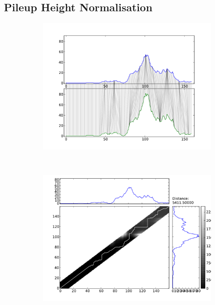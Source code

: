 \documentclass[parskip]{cs4rep}
\begin{document}
\subsection{Pileup Height Normalisation}
\begin{figure}
   \centering
   \begin{subfigure}[b]{0.3\textwidth}
       \includegraphics[width=\textwidth]{figures/methods/pileup_normalisation/mappings_x_1_5_x.pdf}
       \caption{}
       \label{fig:pileup_normalisation:mappings_unnormalised}
   \end{subfigure}
   ~
   \begin{subfigure}[b]{0.3\textwidth}
       \includegraphics[width=\textwidth]{figures/methods/pileup_normalisation/cost_x_1_5_x.pdf}

\end{subfigure}
\end{figure}
\end{document}
